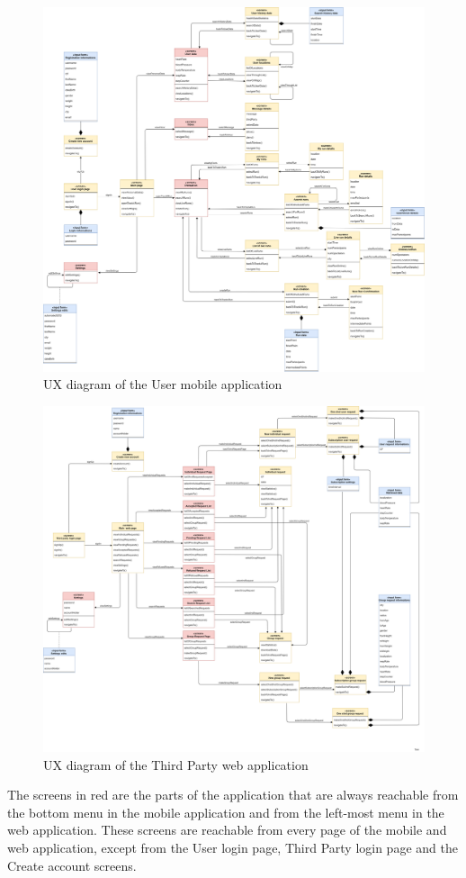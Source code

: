 \begin{figure}[H]
    \centering
    \includegraphics[width=1\textwidth]{./Pictures/UXMobile.png}
    \caption{UX diagram of the User mobile application}
\end{figure}

\begin{figure}[H]
    \centering
    \includegraphics[width=1\textwidth]{DD/Pictures/UXWeb.png}
    \caption{UX diagram of the Third Party web application}
\end{figure}

The screens in red are the parts of the application that are always reachable from the bottom menu in the mobile application and from the left-most menu in the web application. These screens are reachable from every page of the mobile and web application, except from the User login page, Third Party login page and the Create account screens.